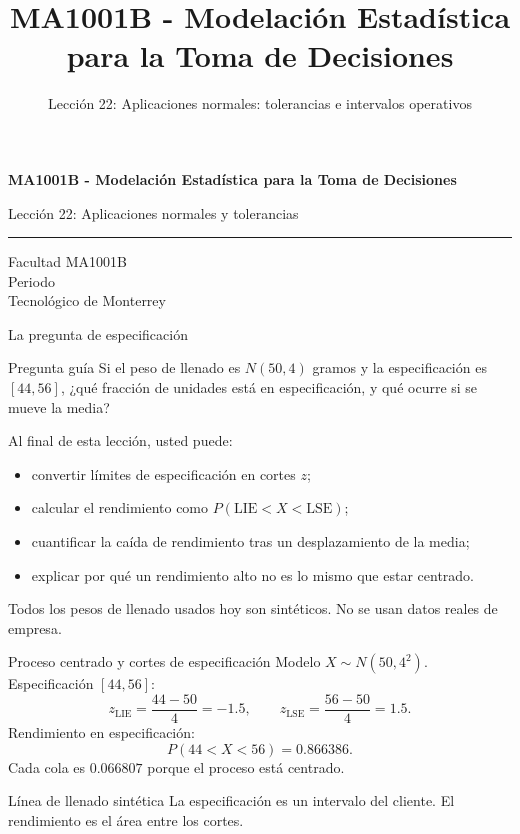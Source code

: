 \documentclass[aspectratio=169,10pt,spanish]{beamer}
\title{MA1001B - Modelación Estadística para la Toma de Decisiones}
\subtitle{Lección 22: Aplicaciones normales: tolerancias e intervalos operativos}
\author{}
\institute{Tecnol\'ogico de Monterrey}
\date{}
\begin{document}
\begin{frame}[plain]
  \vspace{1.2cm}
  {\Large\bfseries MA1001B - Modelación Estadística para la Toma de Decisiones\par}
  \vspace{0.7cm}
  {\large Lección 22: Aplicaciones normales y tolerancias\par}
  \vspace{0.7cm}
  {\color{TecRojo}\rule{\textwidth}{1.2pt}}
  \vspace{0.8cm}

  Facultad MA1001B\\[0.3cm]
  Periodo\\[0.3cm]
  Tecnol\'ogico de Monterrey
\end{frame}

\begin{frame}{La pregunta de especificación}
  \begin{alertblock}{Pregunta guía}
    Si el peso de llenado es $N(50,4)$ gramos y la especificación es
    $[44,56]$, ¿qué fracción de unidades está en especificación, y qué ocurre
    si se mueve la media?
  \end{alertblock}

  \vspace{0.6em}
  Al final de esta lección, usted puede:
  \begin{itemize}
    \item convertir límites de especificación en cortes $z$;
    \item calcular el rendimiento como $P(\mathrm{LIE}<X<\mathrm{LSE})$;
    \item cuantificar la caída de rendimiento tras un desplazamiento de la media;
    \item explicar por qué un rendimiento alto no es lo mismo que estar centrado.
  \end{itemize}

  \vfill
  \scriptsize Todos los pesos de llenado usados hoy son sintéticos. No se usan datos reales de empresa.
\end{frame}

\begin{frame}{Proceso centrado y cortes de especificación}
  \small
  Modelo $X\sim N(50,4^2)$. Especificación $[44,56]$:
  \[
    z_{\mathrm{LIE}}=\frac{44-50}{4}=-1.5,\qquad
    z_{\mathrm{LSE}}=\frac{56-50}{4}=1.5.
  \]
  Rendimiento en especificación:
  \[
    P(44<X<56)=0.866386.
  \]
  Cada cola es $0.066807$ porque el proceso está centrado.

  \vspace{0.3em}
  \begin{exampleblock}{Línea de llenado sintética}
    La especificación es un intervalo del cliente. El rendimiento es el área
    entre los cortes.
  \end{exampleblock}
\end{frame}
\end{document}
